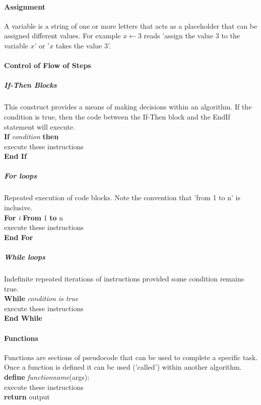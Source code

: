 \documentclass[a4paper,twoside,10pt]{article}
\newcommand{\codeindent}{\indent\hspace{2em}}
\begin{document}
			\paragraph{Assignment} A variable is a string of one or more letters that acts as a placeholder that can be assigned different values. For example $x\leftarrow3$ reads 'assign the value 3 to the variable $x$' or '$x$ takes the value 3'.
			
			\paragraph{Control of Flow of Steps}
				\subparagraph{If-Then Blocks} This construct provides a means of making decisions within an algorithm. If the condition is true, then the code between the If-Then block and the EndIf statement will execute.\\
				\textbf{If} \textit{condition} \textbf{then}\\
				\codeindent execute these instructions\\
				\textbf{End If}
				
				\subparagraph{For loops} Repeated execution of code blocks. Note the convention that 'from 1 to n' is inclusive.\\
				\textbf{For} \textit{i} \textbf{From} 1 \textbf{to} n\\
				\codeindent execute these instructions\\
				\textbf{End For}
				
				\subparagraph{While loops} Indefinite repeated iterations of instructions provided some condition remains true.\\
				\textbf{While} \textit{condition is true}\\
				\codeindent execute these instructions\\
				\textbf{End While}
				
			\paragraph{Functions} Functions are sections of pseudocode that can be used to complete a specific task. Once a function is defined it can be used ('called') within another algorithm.\\
			\textbf{define} \textit{function\textunderscore name}(args):\\
			\codeindent execute these instructions\\
			\textbf{return} output
\end{document}
